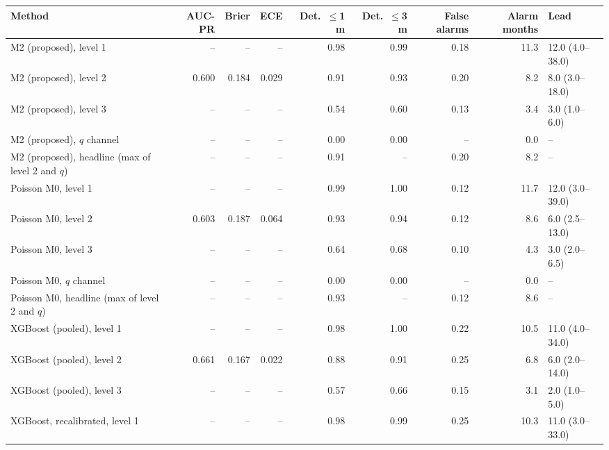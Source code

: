 \documentclass[10pt,a4paper]{article}
\begin{document}
\vspace{6pt}
\noindent\begin{minipage}{\linewidth}
\centering\tiny
\begin{tabular}{lrrrrrrrl}
\toprule
Method & AUC-PR & Brier & ECE & Det.\ $\leq$1 m & Det.\ $\leq$3 m & False alarms & Alarm months & Lead \\ \midrule
M2 (proposed), level 1 & -- & -- & -- & 0.98 & 0.99 & 0.18 & 11.3 & 12.0 (4.0--38.0) \\
M2 (proposed), level 2 & 0.600 & 0.184 & 0.029 & 0.91 & 0.93 & 0.20 & 8.2 & 8.0 (3.0--18.0) \\
M2 (proposed), level 3 & -- & -- & -- & 0.54 & 0.60 & 0.13 & 3.4 & 3.0 (1.0--6.0) \\
M2 (proposed), $q$ channel & -- & -- & -- & 0.00 & 0.00 & -- & 0.0 & -- \\
M2 (proposed), headline (max of level 2 and $q$) & -- & -- & -- & 0.91 & -- & 0.20 & 8.2 & -- \\
Poisson M0, level 1 & -- & -- & -- & 0.99 & 1.00 & 0.12 & 11.7 & 12.0 (3.0--39.0) \\
Poisson M0, level 2 & 0.603 & 0.187 & 0.064 & 0.93 & 0.94 & 0.12 & 8.6 & 6.0 (2.5--13.0) \\
Poisson M0, level 3 & -- & -- & -- & 0.64 & 0.68 & 0.10 & 4.3 & 3.0 (2.0--6.5) \\
Poisson M0, $q$ channel & -- & -- & -- & 0.00 & 0.00 & -- & 0.0 & -- \\
Poisson M0, headline (max of level 2 and $q$) & -- & -- & -- & 0.93 & -- & 0.12 & 8.6 & -- \\
XGBoost (pooled), level 1 & -- & -- & -- & 0.98 & 1.00 & 0.22 & 10.5 & 11.0 (4.0--34.0) \\
XGBoost (pooled), level 2 & 0.661 & 0.167 & 0.022 & 0.88 & 0.91 & 0.25 & 6.8 & 6.0 (2.0--14.0) \\
XGBoost (pooled), level 3 & -- & -- & -- & 0.57 & 0.66 & 0.15 & 3.1 & 2.0 (1.0--5.0) \\
XGBoost, recalibrated, level 1 & -- & -- & -- & 0.98 & 0.99 & 0.25 & 10.3 & 11.0 (3.0--33.0) \\

\end{tabular}
\end{minipage}
\end{document}
